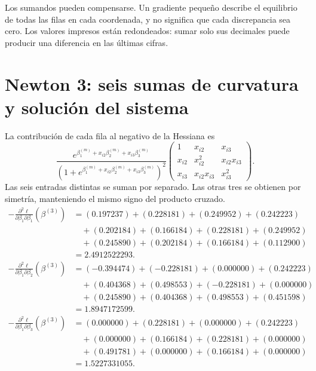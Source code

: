 \documentclass[11pt,a4paper]{article}
\begin{document}
Los sumandos pueden compensarse.
Un gradiente pequeño describe el equilibrio de todas las filas
en cada coordenada, y no significa que cada discrepancia sea cero.
Los valores impresos están redondeados: sumar solo sus decimales
puede producir una diferencia en las últimas cifras.

\clearpage
\section{Newton 3: seis sumas de curvatura y solución del sistema}\label{logit103}
\begingroup\small
\setlength{\abovedisplayskip}{3pt}\setlength{\belowdisplayskip}{3pt}
\setlength{\jot}{2pt}\setlength{\parskip}{3pt}
La contribución de cada fila al negativo de la Hessiana es
\[
\frac{e^{\beta_1^{(m)}+x_{i2}\beta_2^{(m)}+x_{i3}\beta_3^{(m)}}}
{(1+e^{\beta_1^{(m)}+x_{i2}\beta_2^{(m)}+x_{i3}\beta_3^{(m)}})^2}
\begin{pmatrix}
1&x_{i2}&x_{i3}\\
x_{i2}&x_{i2}^2&x_{i2}x_{i3}\\
x_{i3}&x_{i2}x_{i3}&x_{i3}^2
\end{pmatrix}.
\]
Las seis entradas distintas se suman por separado.
Las otras tres se obtienen por simetría, manteniendo el
mismo signo del producto cruzado.
\[
\begin{aligned}
-\frac{\partial^2\ell}{\partial\beta_1\partial\beta_1}(\beta^{(3)})&=(0.197237)+(0.228181)+(0.249952)+(0.242223)\\&\quad+(0.202184)+(0.166184)+(0.228181)+(0.249952)\\&\quad+(0.245890)+(0.202184)+(0.166184)+(0.112900)\\&=2.4912522293.\end{aligned}
\]
\[
\begin{aligned}
-\frac{\partial^2\ell}{\partial\beta_1\partial\beta_2}(\beta^{(3)})&=(-0.394474)+(-0.228181)+(0.000000)+(0.242223)\\&\quad+(0.404368)+(0.498553)+(-0.228181)+(0.000000)\\&\quad+(0.245890)+(0.404368)+(0.498553)+(0.451598)\\&=1.8947172599.\end{aligned}
\]
\[
\begin{aligned}
-\frac{\partial^2\ell}{\partial\beta_1\partial\beta_3}(\beta^{(3)})&=(0.000000)+(0.228181)+(0.000000)+(0.242223)\\&\quad+(0.000000)+(0.166184)+(0.228181)+(0.000000)\\&\quad+(0.491781)+(0.000000)+(0.166184)+(0.000000)\\&=1.5227331055.\end{aligned}
\]
\end{document}
